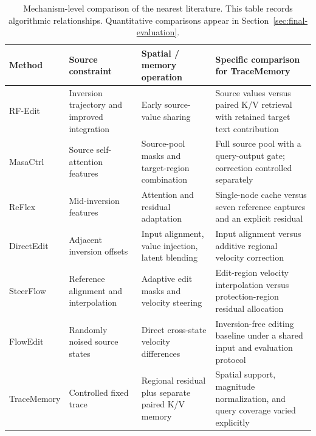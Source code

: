 \begin{table}[t]
\centering\small
\caption{Mechanism-level comparison of the nearest literature. This table records algorithmic relationships. Quantitative comparisons appear in Section~\ref{sec:final-evaluation}.}
\label{tab:nearest}
\begin{tabular}{p{}p{}p{}p{}}
\toprule
Method & Source constraint & Spatial / memory operation & Specific comparison for TraceMemory\\
\midrule
RF-Edit \cite{wang2025rfsolver} & Inversion trajectory and improved integration & Early source-value sharing & Source values versus paired K/V retrieval with retained target text contribution\\
MasaCtrl \cite{cao2023masactrl} & Source self-attention features & Source-pool masks and target-region combination & Full source pool with a query-output gate; correction controlled separately\\
ReFlex \cite{kim2025reflex} & Mid-inversion features & Attention and residual adaptation & Single-node cache versus seven reference captures and an explicit residual\\
DirectEdit \cite{yang2026directedit} & Adjacent inversion offsets & Input alignment, value injection, latent blending & Input alignment versus additive regional velocity correction\\
SteerFlow \cite{dao2026steerflow} & Reference alignment and interpolation & Adaptive edit masks and velocity steering & Edit-region velocity interpolation versus protection-region residual allocation\\
FlowEdit \cite{kulikov2025flowedit} & Randomly noised source states & Direct cross-state velocity differences & Inversion-free editing baseline under a shared input and evaluation protocol\\
TraceMemory & Controlled fixed trace & Regional residual plus separate paired K/V memory & Spatial support, magnitude normalization, and query coverage varied explicitly\\
\bottomrule
\end{tabular}
\end{table}
